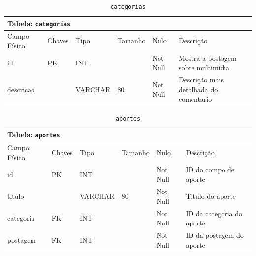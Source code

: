 \documentclass[12pt,a4paper]{article}
\begin{document}
\begin{center}
\begin{table}[h!]
	\caption{\texttt{categorias}}
	\label{tabela:categorias}
	\begin{tabular}{|p{2.3cm}|p{1.2cm}|p{1.8cm}|p{1.5cm}|p{1cm}|p{6cm}|}\hline	
		\multicolumn{6}{|p{16cm}|}{\cellcolor{cinzaClaro}  \centering Tabela: \texttt{categorias}} \\ \hline %
		{\small Campo Físico}   & {\small Chaves} & {\small Tipo} & {\small Tamanho} & {\small Nulo} & {\small Descrição}\\\hline %
		
		{\tiny id} & {\tiny PK} & {\tiny INT} & {\tiny } & {\tiny Not Null} &{\tiny Mostra a postagem sobre multimidia}\\\hline
		{\tiny descricao} & {\tiny } & {\tiny VARCHAR} & {\tiny 80} & {\tiny Not Null} &{\tiny Descrição mais detalhada do comentario}\\\hline
		
			
	\end{tabular}
\end{table}	
\end{center}

\begin{center}
\begin{table}[h!]
	\caption{\texttt{aportes}}
	\label{tabela:aportes}
	\begin{tabular}{|p{2.3cm}|p{1.2cm}|p{1.8cm}|p{1.5cm}|p{1cm}|p{6cm}|}\hline	
		\multicolumn{6}{|p{16cm}|}{\cellcolor{cinzaClaro}  \centering Tabela: \texttt{aportes}} \\ \hline %
		{\small Campo Físico}   & {\small Chaves} & {\small Tipo} & {\small Tamanho} & {\small Nulo} & {\small Descrição}\\\hline %
		
		{\tiny id } & {\tiny PK} & {\tiny INT} & {\tiny } & {\tiny Not Null} &{\tiny ID do compo de aporte}\\\hline
		{\tiny titulo} & {\tiny } & {\tiny VARCHAR} & {\tiny 80} & {\tiny Not Null} &{\tiny Titulo do aporte}\\\hline
		{\tiny categoria} & {\tiny FK} & {\tiny INT} & {\tiny } & {\tiny Not Null} &{\tiny ID da categoria do aporte}\\\hline
		{\tiny postagem} & {\tiny FK} & {\tiny INT} & {\tiny } & {\tiny Not Null} &{\tiny ID da postagem do aporte}\\\hline
			
	\end{tabular}
\end{table}	
\end{center}
\end{document}
